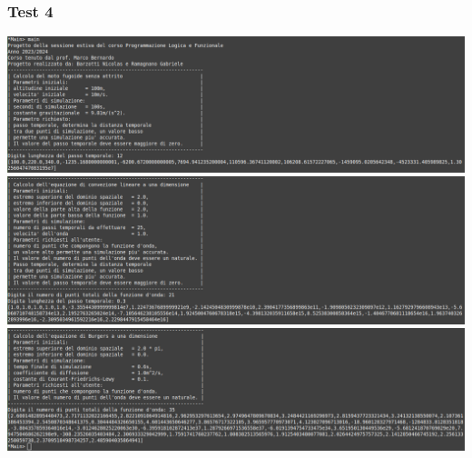 \subsubsection*{Test 4}
\includegraphics[width=\textwidth,height=\textheight,keepaspectratio]{05_testing/image/hs/04_test/01_normale.png}
\\
\includegraphics[width=\textwidth,height=\textheight,keepaspectratio]{05_testing/image/hs/04_test/03_normale.png}
\\
\includegraphics[width=\textwidth,height=\textheight,keepaspectratio]{05_testing/image/hs/04_test/04_normale.png}

